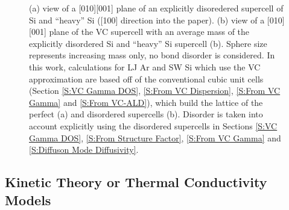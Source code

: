 \documentclass[aps,prb,twocolumn,superscriptaddress,amsmath,amssymb,floatfix]{revtex4}
\begin{document}
\begin{figure}
\begin{center}
\mbox{}
\vspace*{0mm}
\end{center}
\caption{\label{F:supercells} 
(a) view of a [010][001] plane of  
an explicitly disoredered supercell of 
Si and ``heavy'' Si ([100] direction into the paper).
\cite{momma_vesta:_2008} 
(b) view of a [010][001] plane of the VC supercell 
with an average
mass of the explicitly disordered Si and ``heavy'' Si supercell 
(b). 
Sphere size represents 
increasing mass 
only, no bond disorder is considered. 
In this work, calculations for LJ Ar and SW Si which use the VC 
approximation 
are based off of the conventional cubic unit cells 
(Section \ref{S:VC Gamma DOS}, \ref{S:From VC Dispersion}, 
\ref{S:From VC Gamma} and \ref{S:From VC-ALD}), 
which build the lattice of the perfect (a) 
and disordered supercells (b). 
Disorder is taken into account explicitly using the disordered 
supercells in Sections 
\ref{S:VC Gamma DOS}, \ref{S:From Structure Factor},  
\ref{S:From VC Gamma} and \ref{S:Diffuson Mode Diffusivity}. 
}
\end{figure}



\subsection{\label{S:Kinetic Theory}Kinetic Theory or 
Thermal Conductivity Models}
\end{document}
